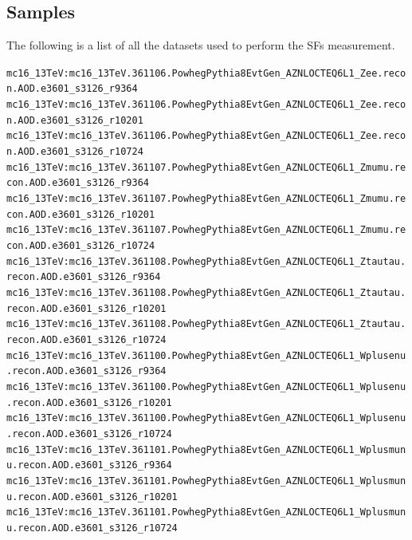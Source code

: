 \subsection{Samples}\label{SampleFiles}
The following is a list of all the datasets used to perform the SFs measurement.

\fontsize{0.3cm}{0.3cm}\texttt{mc16\_13TeV:mc16\_13TeV.361106.PowhegPythia8EvtGen\_AZNLOCTEQ6L1\_Zee.recon.AOD.e3601\_s3126\_r9364\newline   
 mc16\_13TeV:mc16\_13TeV.361106.PowhegPythia8EvtGen\_AZNLOCTEQ6L1\_Zee.recon.AOD.e3601\_s3126\_r10201\newline   
 mc16\_13TeV:mc16\_13TeV.361106.PowhegPythia8EvtGen\_AZNLOCTEQ6L1\_Zee.recon.AOD.e3601\_s3126\_r10724\newline   
 mc16\_13TeV:mc16\_13TeV.361107.PowhegPythia8EvtGen\_AZNLOCTEQ6L1\_Zmumu.recon.AOD.e3601\_s3126\_r9364\newline   
 mc16\_13TeV:mc16\_13TeV.361107.PowhegPythia8EvtGen\_AZNLOCTEQ6L1\_Zmumu.recon.AOD.e3601\_s3126\_r10201\newline    
 mc16\_13TeV:mc16\_13TeV.361107.PowhegPythia8EvtGen\_AZNLOCTEQ6L1\_Zmumu.recon.AOD.e3601\_s3126\_r10724\newline    
 mc16\_13TeV:mc16\_13TeV.361108.PowhegPythia8EvtGen\_AZNLOCTEQ6L1\_Ztautau.recon.AOD.e3601\_s3126\_r9364\newline    
 mc16\_13TeV:mc16\_13TeV.361108.PowhegPythia8EvtGen\_AZNLOCTEQ6L1\_Ztautau.recon.AOD.e3601\_s3126\_r10201\newline    
 mc16\_13TeV:mc16\_13TeV.361108.PowhegPythia8EvtGen\_AZNLOCTEQ6L1\_Ztautau.recon.AOD.e3601\_s3126\_r10724\newline    
 mc16\_13TeV:mc16\_13TeV.361100.PowhegPythia8EvtGen\_AZNLOCTEQ6L1\_Wplusenu.recon.AOD.e3601\_s3126\_r9364\newline    
 mc16\_13TeV:mc16\_13TeV.361100.PowhegPythia8EvtGen\_AZNLOCTEQ6L1\_Wplusenu.recon.AOD.e3601\_s3126\_r10201\newline    
 mc16\_13TeV:mc16\_13TeV.361100.PowhegPythia8EvtGen\_AZNLOCTEQ6L1\_Wplusenu.recon.AOD.e3601\_s3126\_r10724\newline    
 mc16\_13TeV:mc16\_13TeV.361101.PowhegPythia8EvtGen\_AZNLOCTEQ6L1\_Wplusmunu.recon.AOD.e3601\_s3126\_r9364\newline    
 mc16\_13TeV:mc16\_13TeV.361101.PowhegPythia8EvtGen\_AZNLOCTEQ6L1\_Wplusmunu.recon.AOD.e3601\_s3126\_r10201\newline    
 mc16\_13TeV:mc16\_13TeV.361101.PowhegPythia8EvtGen\_AZNLOCTEQ6L1\_Wplusmunu.recon.AOD.e3601\_s3126\_r10724\newline    
}
